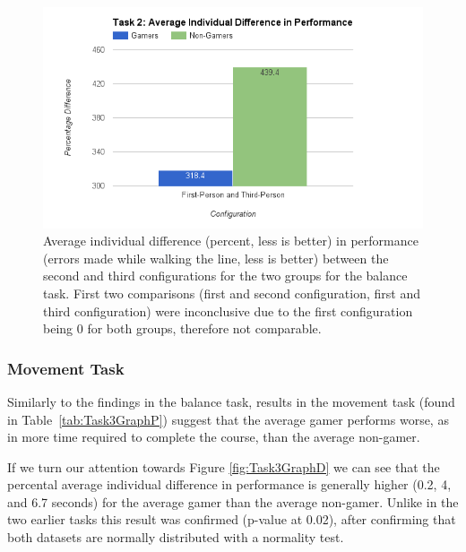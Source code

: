 \documentclass[runningheads,a4paper,oribibl]{llncs}
\begin{document}
\begin{figure}
   \centering
   \includegraphics[width=\textwidth]{ExternalMaterial/Task2GraphD}
   \caption{Average individual difference (percent, less is better) in performance (errors made while walking the line, less is better) between the second and third configurations for the two groups for the balance task. First two comparisons (first and second configuration, first and third configuration) were inconclusive due to the first configuration being 0 for both groups, therefore not comparable.} \label{fig:Task2GraphD}
\end{figure}













\subsubsection{Movement Task}
Similarly to the findings in the balance task, results in the movement task (found in Table~\ref{tab:Task3GraphP}) suggest that the average gamer performs worse, as in more time required to complete the course, than the average non-gamer. 

If we turn our attention towards Figure \ref{fig:Task3GraphD} we can see that the percental average individual difference in performance is generally higher (0.2, 4, and 6.7 seconds) for the average gamer than the average non-gamer. Unlike in the two earlier tasks this result was confirmed (p-value at 0.02), after confirming that both datasets are normally distributed with a normality test.
\end{document}
